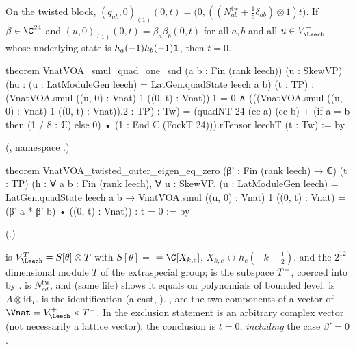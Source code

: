 \begin{lemma}\label{ch20:lem:twisted}
On the twisted block, $(q_{ab},0)_{(1)}(0,t)=\bigl(0,((N^{\mathrm{tw}}_{ab}+\tfrac18\delta_{ab})\otimes1)t\bigr)$.  If
$\beta\in\C^{24}$ and $(u,0)_{(1)}(0,t)=\beta_a\beta_b(0,t)$ for all $a,b$ and all $u\in\chtwentyVL$ whose underlying state is
$h_a(-1)h_b(-1)\mathbf 1$, then $t=0$.
\end{lemma}
\begin{leancode}
theorem VnatVOA_smul_quad_one_snd (a b : Fin (rank leech)) (u : SkewVP)
    (hu : (u : LatModuleGen leech) = LatGen.quadState leech a b) (t : TP) :
    (VnatVOA.smul ((u, 0) : Vnat) 1 ((0, t) : Vnat)).1 = 0 ∧
      (((VnatVOA.smul ((u, 0) : Vnat) 1 ((0, t) : Vnat)).2 : TP) : Tw)
        = (quadNT 24 (cc a) (cc b)
            + (if a = b then (1 / 8 : ℂ) else 0) • (1 : End ℂ (FockT 24))).rTensor leechT (t : Tw) := by
\end{leancode}
(, namespace .)
\begin{leancode}
theorem VnatVOA_twisted_outer_eigen_eq_zero (β' : Fin (rank leech) → ℂ) (t : TP)
    (h : ∀ a b : Fin (rank leech), ∀ u : SkewVP,
      (u : LatModuleGen leech) = LatGen.quadState leech a b →
        VnatVOA.smul ((u, 0) : Vnat) 1 ((0, t) : Vnat) = (β' a * β' b) • ((0, t) : Vnat)) :
    t = 0 := by
\end{leancode}
(.)
\begin{dictionary}
 is $V_\Leech^T=S[\theta]\otimes T$ with $S[\theta]=$  $=\C[X_{k,c}]$, $X_{k,c}\leftrightarrow
h_c(-k-\tfrac12)$, and  the $2^{12}$-dimensional module $T$ of the extraspecial group;  is the
subspace $T^{+}$, coerced into  by .   is $N^{\mathrm{tw}}_{cd}$, and
 (same file) shows it equals  on polynomials of bounded level.
 is $A\otimes\mathrm{id}_T$.   is the identification 
(a cast, ).  ,  are the two components of a vector of
$\Vnat=\chtwentyVL\times\chtwentyTp$.  In the exclusion statement  is an arbitrary complex vector (not
necessarily a lattice vector); the conclusion is $t=0$, \emph{including} the case $\beta'=0$.
\end{dictionary}
